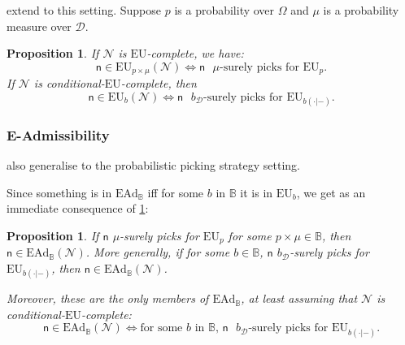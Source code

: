 \documentclass[a4paper]{article}
\newtheorem{proposition}[theorem]{Proposition}
\newcommand\EU{\mathrm{EU}}
\newcommand\EAd{\mathrm{EAd}}
\newcommand{\D}{\mathcal{D}}
\newcommand{\Decs}{\mathcal{D}}
\newcommand{\n}{\mathsf{n}}
\newcommand\Nu{\mathcal{N}}
\newcommand{\IB}{\mathbb{B}}
\renewcommand{\color}[1]{}
\newenvironment{CCM rewritten}
{\begingroup\color{blue}} %
{\endgroup}              %
\begin{document}
 extend to this setting.
Suppose $p$ is a probability over $\Omega$ and $\mu$ is a probability measure over $\D$.
\begin{proposition}\label{thm:eu-nu-nec-suff}
If $\Nu$ is $\EU$-complete, we have:
$$\n \in \EU_{p\times \mu}(\Nu) \Leftrightarrow \n \text{ $\mu$-surely picks for $\EU_p$.}$$
If $\Nu$ is conditional-$\EU$-complete, then
$$\n \in \EU_{b}(\Nu) \Leftrightarrow \n \text{ $b_\Decs$-surely picks for $\EU_{b(\cdot|-)}$.}$$
\end{proposition}


\subsubsection{E-Admissibility}
 also generalise to the probabilistic picking strategy setting. 


Since something is in $\EAd_\IB$ iff for some $b$ in $\IB$ it is in $\EU_b$, we get as an immediate consequence of \cref{thm:eu-nu-nec-suff}:
\begin{proposition}\label{thm:ead-nu-nec-suff}
If $\n$ $\mu$-surely picks for $\EU_p$ for some $p\times \mu\in \IB$, then $\n\in\EAd_\IB(\Nu)$. More generally, if for some $b\in\IB$, $\n$ $b_\Decs$-surely picks for $\EU_{b(\cdot|-)}$, then $\n\in\EAd_\IB(\Nu)$. 

Moreover, these are the only members of $\EAd_\IB$, at least assuming that $\Nu$ is conditional-$\EU$-complete: 
$$\n \in \EAd_\IB(\Nu) \Leftrightarrow \text{for some $b$ in $\IB$, $\n$ $b_\Decs$-surely picks for $\EU_{b(\cdot|-)}$.}$$

\end{proposition}
\end{document}
